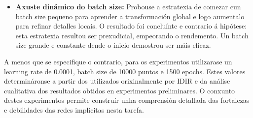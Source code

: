 \begin{itemize}
\item \textbf{Axuste dinámico do batch size:} Probouse a estratexia de comezar cun batch size pequeno para aprender a transformación global e logo aumentalo para refinar detalles locais. O resultado foi concluínte e contrario á hipótese: esta estratexia resultou ser prexudicial, empeorando o rendemento. Un batch size grande e constante dende o inicio demostrou ser máis eficaz.

\end{itemize}

A menos que se especifique o contrario, para os experimentos utilizarase un learning rate de 0.0001, batch size de 10000 puntos e 1500 epochs. Estes valores determináronse a partir dos utilizados orixinalmente por IDIR e da análise cualitativa dos resultados obtidos en experimentos preliminares. O conxunto destes experimentos permite construír unha comprensión detallada das fortalezas e debilidades das redes implícitas nesta tarefa.
